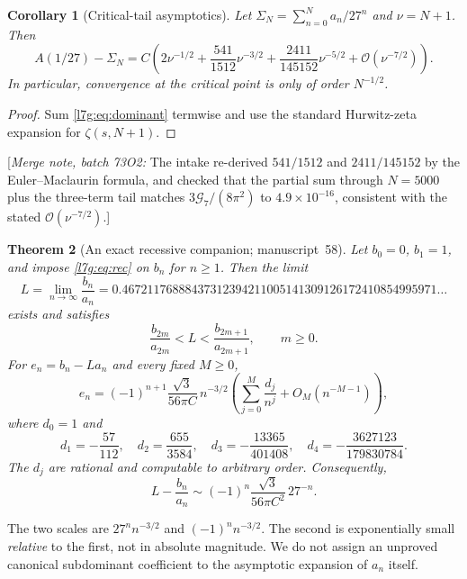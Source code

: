 \documentclass[11pt,letterpaper]{article}
\newtheorem{theorem}{Theorem}[section]
\newtheorem{corollary}[theorem]{Corollary}
\theoremstyle{remark}\newtheorem{remark}[theorem]{Remark}
\newcommand{\G}{\mathcal G_7}\newcommand{\Ast}{A_\star}
\newcommand{\bigO}{\mathcal O}\newcommand{\Ct}{C_{t}}
\newcommand{\mergenote}[1]{\textup{[}\emph{Merge note, batch 73O2:} #1\textup{]}}
\newcounter{l7gtrsavedeq}
\begin{document}
\begin{corollary}[Critical-tail asymptotics]\label{l7g:cm:cor:tail}
Let $\Sigma_N=\sum_{n=0}^{N}a_n/27^n$ and $\nu=N+1$. Then
\begin{equation}\label{l7g:cm:eq:tail}
 A(1/27)-\Sigma_N
 =C\left(
 2\nu^{-1/2}+\frac{541}{1512}\nu^{-3/2}
 +\frac{2411}{145152}\nu^{-5/2}
 +\bigO(\nu^{-7/2})\right).
\end{equation}
In particular, convergence at the critical point is only of order
$N^{-1/2}$.
\end{corollary}
\begin{proof}
Sum \eqref{l7g:eq:dominant} termwise and use the standard Hurwitz-zeta
expansion for $\zeta(s,N+1)$.
\end{proof}
\mergenote{The intake re-derived $541/1512$ and $2411/145152$ by the
Euler--Maclaurin formula, and checked that the partial sum through
$N=5000$ plus the three-term tail matches $3\G/(8\pi^2)$ to
$4.9\times10^{-16}$, consistent with the stated $\bigO(\nu^{-7/2})$.}

\begin{theorem}[An exact recessive companion; manuscript~58]\label{l7g:th:companion}
Let $b_0=0$, $b_1=1$, and impose \eqref{l7g:eq:rec} on $b_n$ for $n\ge1$.
Then the limit
\begin{equation}\label{l7g:eq:L}
 L=\lim_{n\to\infty}\frac{b_n}{a_n}
 =0.46721176888437312394211005141309126172410854995971\ldots
\end{equation}
exists and satisfies
\begin{equation}\label{l7g:eq:bracket}
 \frac{b_{2m}}{a_{2m}}<L<\frac{b_{2m+1}}{a_{2m+1}},\qquad m\ge0.
\end{equation}
For $e_n=b_n-La_n$ and every fixed $M\ge0$,
\begin{equation}\label{l7g:eq:minimal}
 e_n=(-1)^{n+1}\frac{\sqrt3}{56\pi C}\,n^{-3/2}
 \left(\sum_{j=0}^M\frac{d_j}{n^j}+O_M(n^{-M-1})\right),
\end{equation}
where $d_0=1$ and
\begin{equation}\label{l7g:eq:dvalues}
 d_1=-\frac{57}{112},\quad d_2=\frac{655}{3584},\quad
 d_3=-\frac{13365}{401408},\quad d_4=-\frac{3627123}{179830784}.
\end{equation}
The $d_j$ are rational and computable to arbitrary order. Consequently,
\begin{equation}\label{l7g:eq:CFerror}
 L-\frac{b_n}{a_n}\sim(-1)^n\frac{\sqrt3}{56\pi C^2}\,27^{-n}.
\end{equation}
\end{theorem}
The two scales are $27^nn^{-3/2}$ and $(-1)^nn^{-3/2}$. The second is
exponentially small \emph{relative} to the first, not in absolute
magnitude. We do not assign an unproved canonical subdominant coefficient
to the asymptotic expansion of $a_n$ itself.
\end{document}
